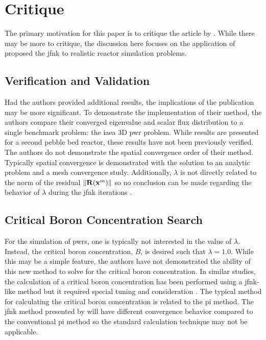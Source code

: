 \section{Critique}
\label{sec:critique}

  The primary motivation for this paper is to critique the article by
  \citeauthor{qe2paper}. While there may be more to critique, the discussion
  here focuses on the application of proposed the \gls{jfnk} to realistic
  reactor simulation problems.

  \subsection{Verification and Validation}

    Had the authors provided additional results, the implications of the
    publication may be more significant. To demonstrate the implementation of
    their method, the authors compare their converged eigenvalue and scalar flux
    distribution to a single benchmark problem: the \gls{iaea} 3D \gls{pwr}
    problem. While results are presented for a second pebble bed reactor, these
    results have not been previously verified. The authors do not demonstrate
    the spatial convergence order of their method. Typically spatial convergence
    is demonstrated with the solution to an analytic problem and a mesh
    convergence study. Additionally, $\lambda$ is not directly related to the
    norm of the residual $\| \mathbf{R} (\mathbf{x}^m) \|$ so no conclusion can be made
    regarding the behavior of $\lambda$ during the \gls{jfnk} iterations
    \cite{caslJFNK}.

  \subsection{Critical Boron Concentration Search}

    For the simulation of \glspl{pwr}, one is typically not interested in the
    value of $\lambda$. Instead, the critical boron concentration, $B$, is
    desired such that $\lambda=1.0$. While this may be a simple feature, the
    authors have not demonstrated the ability of this new method to solve for
    the critical boron concentration. In similar studies, the calculation of a
    critical boron concentration has been performed using a \gls{jfnk}-like
    method but it required special tuning and consideration \cite{caslJFNK}. The
    typical method for calculating the critical boron concentration is related
    to the \gls{pi} method. The \gls{jfnk} method presented by
    \citeauthor{qe2paper} will have different convergence behavior compared to
    the conventional \gls{pi} method so the standard calculation technique may
    not be applicable.

